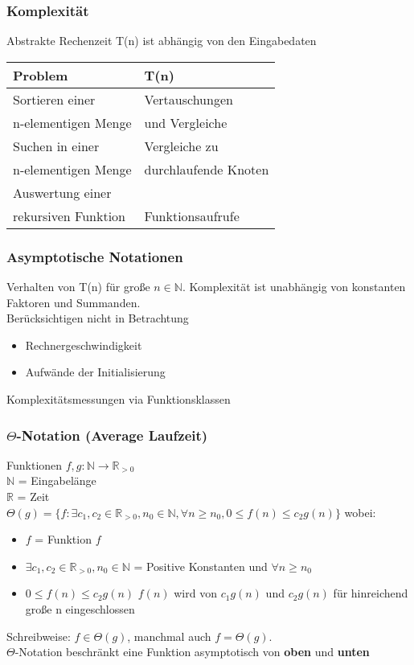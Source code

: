\documentclass[jou,apacite]{apa6}
\begin{document}
\subsubsection{Komplexität}
Abstrakte Rechenzeit T(n) ist abhängig von den Eingabedaten
\begin{table}[h]
\centering
\begin{tabular}{|l|l|}
\hline
Problem     &   T(n)    \\
\hline
Sortieren einer   &   Vertauschungen \\ n-elementigen Menge &  und Vergleiche       \\
\hline
Suchen in einer  &   Vergleiche zu \\ n-elementigen Menge & durchlaufende Knoten  \\
\hline
Auswertung einer     & \\ rekursiven Funktion &   Funktionsaufrufe                \\
\hline
\end{tabular}
\end{table}

\subsubsection{Asymptotische Notationen}
Verhalten von T(n) für große $n \in \mathbb{N}$.
Komplexität ist unabhängig von konstanten Faktoren und Summanden. \\
Berücksichtigen nicht in Betrachtung
\begin{itemize}
    \item Rechnergeschwindigkeit 
    \item Aufwände der Initialisierung
\end{itemize}
Komplexitätsmessungen via Funktionsklassen \\


\subsubsection{$\Theta$-Notation (Average Laufzeit)} 
Funktionen $f,g: \mathbb{N} \to \mathbb{R}_{>0}$\\
$\mathbb{N}$ = Eingabelänge \\
$\mathbb{R}$ = Zeit 
\\
$\Theta(g) = \{f : \exists c_1,c_2\in\mathbb{R}_{>0},n_0\in\mathbb{N},\forall n\geq n_0,0\leq f(n) \leq c_2g(n)\}$
wobei:
\begin{itemize}
    \item $f$ = Funktion $f$
    \item $\exists c_1,c_2\in\mathbb{R}_{>0},n_0\in\mathbb{N}$ = Positive Konstanten und $\forall n\geq n_0$
    \item $0\leq f(n) \leq c_2g(n)$ $f(n)$ wird von $c_1g(n)$ und $c_2g(n)$ für hinreichend große n eingeschlossen
\end{itemize}
Schreibweise: $f\in \Theta(g)$, manchmal auch $f= \Theta(g)$. \\
$\Theta$-Notation beschränkt eine Funktion asymptotisch von {\bfseries oben} und {\bfseries unten}
\end{document}
